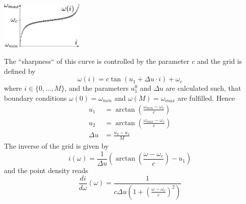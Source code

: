 \begin{center}
	\includegraphics[width=0.3\textwidth]{pics/tangrid.eps}
\end{center}

\noindent The ``sharpness`` of this curve is controlled by the parameter $c$ and the grid is defined by
\[
	\omega(i)= c \tan (u_1+\Delta u \cdot i) + \omega_c
\]
where $i\in \{0,\dots,M\}$, and the parameters $u^0_1$ and $\Delta u$ are calculated such, that boundary conditions $\omega(0)=\omega_{min}$ and $\omega(M)=\omega_{max}$ are fulfilled. Hence
\begin{align*}
	u_1&=\arctan\left(\frac{\omega_{min}-\omega_c}{c}\right)\\
	u_2&=\arctan\left(\frac{\omega_{max}-\omega_c}{c}\right)\\
	\Delta u&=\frac{u_2-u_1}{M}
\end{align*}
The inverse of the grid is given by
\[
	i(\omega)=\frac{1}{\Delta u}\left(\arctan\left(\frac{\omega-\omega_c}{c}\right)-u_1\right)
\]
and the point density reads
\begin{equation}\label{eqn:tangrid_grid_point_density}
 \frac{di}{d\omega} (\omega) = \frac{1}{c \Delta u\left(1+\left(\frac{\omega-\omega_c}{c}\right)^2\right)}
\end{equation}

